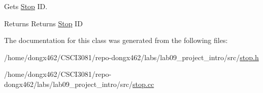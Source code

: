 Gets \hyperlink{classStop}{Stop} ID. 

\begin{DoxyReturn}{Returns}
Returns \hyperlink{classStop}{Stop} ID 
\end{DoxyReturn}


The documentation for this class was generated from the following files\+:\begin{DoxyCompactItemize}
\item 
/home/dongx462/\+C\+S\+C\+I3081/repo-\/dongx462/labs/lab09\+\_\+project\+\_\+intro/src/\hyperlink{stop_8h}{stop.\+h}\item 
/home/dongx462/\+C\+S\+C\+I3081/repo-\/dongx462/labs/lab09\+\_\+project\+\_\+intro/src/\hyperlink{stop_8cc}{stop.\+cc}\end{DoxyCompactItemize}
